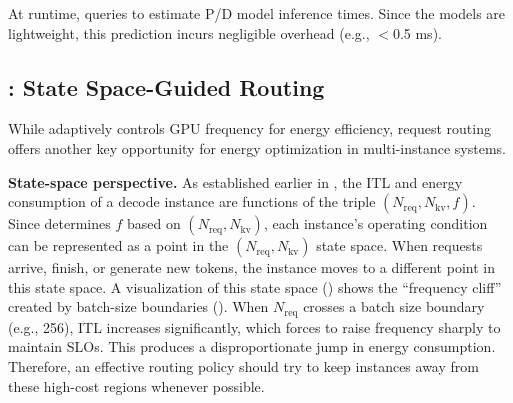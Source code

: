 At runtime, \governor queries \predictor to estimate P/D model inference times.
Since the models are lightweight, this prediction incurs negligible overhead (e.g., $<$0.5 ms). 

\subsection{\router: State Space-Guided Routing} 
\label{subsec:router}

While \governor adaptively controls GPU frequency for energy efficiency, request routing offers another key opportunity for energy optimization in multi-instance systems.

\noindent
\textbf{State-space perspective.}
As established earlier in , the ITL and energy consumption of a decode instance are functions of the triple $(N_{\text{req}}, N_{\text{kv}}, f)$.
Since \governor determines $f$ based on $(N_{\text{req}}, N_{\text{kv}})$, each instance's operating condition can be represented as a point in the $(N_{\text{req}}, N_{\text{kv}})$ state space.
When requests arrive, finish, or generate new tokens, the instance moves to a different point in this state space. 
A visualization of this state space () shows the ``frequency cliff'' created by batch-size boundaries (). When $N_{\text{req}}$ crosses a batch size boundary (e.g., 256), ITL increases significantly, which forces \governor to raise frequency sharply to maintain SLOs. This produces a disproportionate jump in energy consumption. Therefore, an effective routing policy should try to keep instances away from these high-cost regions whenever possible. 

